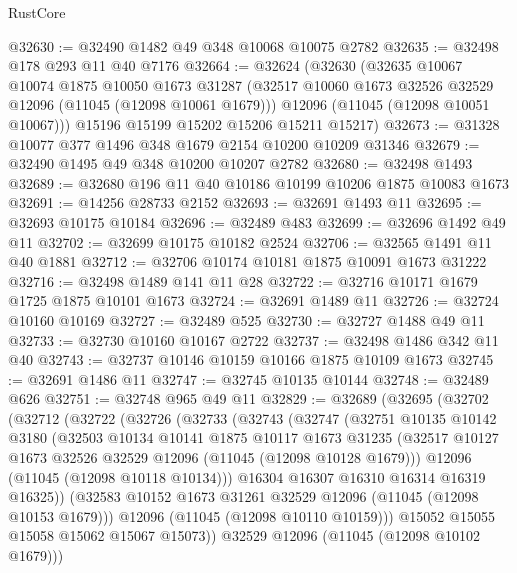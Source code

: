 \begin{lexlean}{RustCore}
\begin{coremodule}
@32630 := @32490 @1482 @49 @348 @10068 @10075 @2782
@32635 := @32498 @178 @293 @11 @40 @7176
@32664 := @32624
    (@32630
      (@32635
        @10067
        @10074
        @1875
        @10050
        @1673
        @31287
        (@32517 @10060 @1673 @32526 @32529 @12096 (@11045 (@12098 @10061 @1679)))
        @12096
        (@11045 (@12098 @10051 @10067)))
      @15196
      @15199
      @15202
      @15206
      @15211
      @15217)
@32673 := @31328 @10077 @377 @1496 @348 @1679 @2154 @10200 @10209 @31346
@32679 := @32490 @1495 @49 @348 @10200 @10207 @2782
@32680 := @32498 @1493
@32689 := @32680 @196 @11 @40 @10186 @10199 @10206 @1875 @10083 @1673
@32691 := @14256 @28733 @2152
@32693 := @32691 @1493 @11
@32695 := @32693 @10175 @10184
@32696 := @32489 @483
@32699 := @32696 @1492 @49 @11
@32702 := @32699 @10175 @10182 @2524
@32706 := @32565 @1491 @11 @40 @1881
@32712 := @32706 @10174 @10181 @1875 @10091 @1673 @31222
@32716 := @32498 @1489 @141 @11 @28
@32722 := @32716 @10171 @1679 @1725 @1875 @10101 @1673
@32724 := @32691 @1489 @11
@32726 := @32724 @10160 @10169
@32727 := @32489 @525
@32730 := @32727 @1488 @49 @11
@32733 := @32730 @10160 @10167 @2722
@32737 := @32498 @1486 @342 @11 @40
@32743 := @32737 @10146 @10159 @10166 @1875 @10109 @1673
@32745 := @32691 @1486 @11
@32747 := @32745 @10135 @10144
@32748 := @32489 @626
@32751 := @32748 @965 @49 @11
@32829 := @32689
    (@32695
      (@32702
        (@32712
          (@32722
            (@32726
              (@32733
                (@32743
                  (@32747
                    (@32751
                      @10135
                      @10142
                      @3180
                      (@32503
                        @10134
                        @10141
                        @1875
                        @10117
                        @1673
                        @31235
                        (@32517 @10127 @1673 @32526 @32529 @12096 (@11045 (@12098 @10128 @1679)))
                        @12096
                        (@11045 (@12098 @10118 @10134)))
                      @16304
                      @16307
                      @16310
                      @16314
                      @16319
                      @16325))
                  (@32583 @10152 @1673 @31261 @32529 @12096 (@11045 (@12098 @10153 @1679)))
                  @12096
                  (@11045 (@12098 @10110 @10159)))
                @15052
                @15055
                @15058
                @15062
                @15067
                @15073))
            @32529
            @12096
            (@11045 (@12098 @10102 @1679)))

\end{coremodule}
\end{lexlean}
